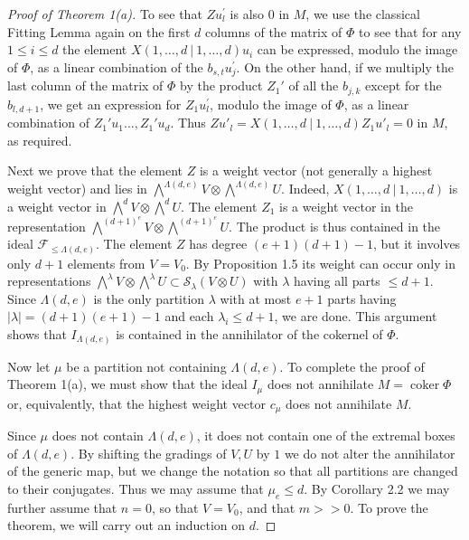 \documentclass{tran-l}
\theoremstyle{plain}
\theoremstyle{remark}
\theoremstyle{definition}
\newcommand{\myS}{{\mathcal S}}
\newcommand{\F}{{\mathcal F}}
\newcommand{\coker}{\operatorname{coker}}
\begin{document}
\begin{proof}[Proof of Theorem \textup{1(a)}]
To see that $Z u_{l}^{\prime }$ is also 0 in $M$,
we use the classical 
Fitting Lemma  again on the
first $d$ columns of the matrix of $\Phi $ to see that for any
$1\leq i\leq d$ the element
$X(1,\ldots ,d\ |\ 1,\ldots ,d )u_{i}$
can be expressed,
modulo the image of $\Phi $, as
a linear combination of the $b_{s,t}u_{j}^{\prime }$.
On the other hand, if we multiply the last
column of the matrix of $\Phi $ by the product $Z_{1}'$ of all
the $b_{j,k}$ except for the $b_{l,d+1}$, we get
an expression for $Z_{1} u_{l}^{\prime }$, modulo the
image of $\Phi $, as a linear
combination of $Z_{1}'u_{1} \ldots ,Z_{1}'u_{d}$.
Thus $Zu'_{l}=X(1,\ldots ,d\ |\ 1,\ldots ,d )Z_{1}u'_{l}=0$ in $M$,
as required.

Next we prove that the element $Z$ is a weight vector (not generally
a highest weight vector) and lies in
$\bigwedge ^{\Lambda (d,e)} V\otimes \bigwedge ^{\Lambda (d,e)} U$.
Indeed, $X(1,\ldots ,d\ |\ 1,\ldots ,d)$ is a weight vector in
$\bigwedge ^{d} V\otimes \bigwedge ^{d} U$.
The element $Z_{1}$ is a weight vector in the representation
$\bigwedge ^{(d+1)^{e}}V\otimes \bigwedge ^{(d+1)^{e}}U$.
The product is thus
contained in the ideal
$\F _{\le \Lambda (d,e)}$.
The element $Z$ has degree $(e+1)(d+1)-1$, but it involves only $d+1$
elements from $V=V_{0}$. By Proposition 1.5 its
weight can occur only in representations 
$\bigwedge ^{\lambda }V\otimes \bigwedge ^{\lambda }U\subset \myS _{\lambda }(V\otimes U)$ 
with
$\lambda $ having all parts $\le d+1$. Since
$\Lambda (d,e)$ is the only partition $\lambda $ with at most
$e+1$ parts having
$|\lambda |=(d+1)(e+1)-1$
and each $\lambda _{i}\le d+1$, we are done.
This argument shows that
$I_{\Lambda (d,e)}$ is contained in the annihilator of the cokernel of
$\Phi $.

Now let $\mu $ be a partition not containing $\Lambda (d,e)$.
To complete the proof of Theorem 1(a), we must show that
the ideal $I_{\mu }$ does not
annihilate $M=\coker \Phi $ or, equivalently, that the highest
weight vector $c_{\mu }$ does not annihilate $M$.

Since $\mu $ does not contain
$\Lambda (d,e)$, it does not contain one of the extremal boxes of
$\Lambda (d,e)$.
By shifting the gradings of $V, U$ by $1$ we do not alter the
annihilator of the generic map, but we
change the notation so that all partitions are changed to their
conjugates. Thus we may assume that $\mu _{e}\le d$.
By Corollary 2.2 we may further assume that $n=0$, so
that $V=V_{0}$, and that $m>>0$.
To prove the theorem, we will carry out an induction on $d$.


\end{proof}
\end{document}
